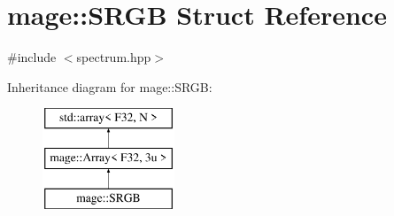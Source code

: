 \hypertarget{structmage_1_1_s_r_g_b}{}\section{mage\+:\+:S\+R\+GB Struct Reference}
\label{structmage_1_1_s_r_g_b}


{\ttfamily \#include $<$spectrum.\+hpp$>$}

Inheritance diagram for mage\+:\+:S\+R\+GB\+:\begin{figure}[H]
\begin{center}
\leavevmode
\includegraphics[height=3.000000cm]{structmage_1_1_s_r_g_b}
\end{center}
\end{figure}

